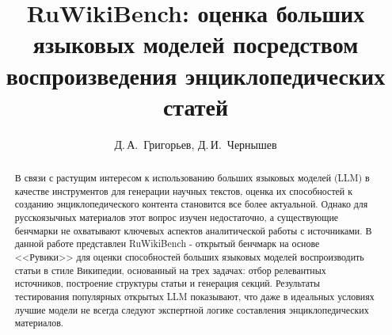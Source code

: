 \documentclass{article}
\begin{document}
\raggedbottom
\Volume{ }
\Pages{ }


\title{RuWikiBench: оценка больших языковых моделей посредством воспроизведения энциклопедических статей}

\author{Д.\,А.~Григорьев\Addressmark[1]\Emailmark[1], Д.\,И.~Чернышев\Addressmark[1]\Emailmark[2]}






\dateA{ }
\dateB{ }
\dateC{ }





\maketitle

\begin{abstract}
В связи с растущим интересом к использованию больших языковых моделей (LLM) в качестве инструментов для генерации научных текстов, 
оценка их способностей к созданию энциклопедического контента становится все более актуальной.
Однако для русскоязычных материалов этот вопрос изучен недостаточно, а существующие бенчмарки не охватывают ключевых аспектов аналитической работы с источниками.
В данной работе представлен RuWikiBench - открытый бенчмарк на основе <<Рувики>> для оценки способностей больших языковых моделей воспроизводить статьи в стиле Википедии, 
основанный на трех задачах: отбор релевантных источников, построение структуры статьи и генерация секций.
Результаты тестирования популярных открытых LLM показывают, что даже в идеальных условиях лучшие модели не всегда следуют экспертной логике составления энциклопедических материалов. 
\end{abstract}
\end{document}
